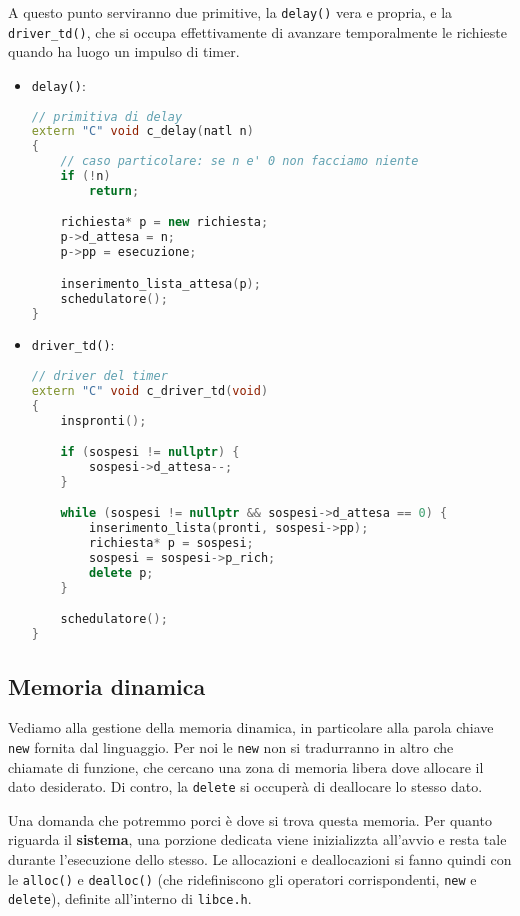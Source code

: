 \documentclass[a4paper,11pt]{article}
\begin{document}
A questo punto serviranno due primitive, la \lstinline|delay()| vera e propria, e la \lstinline|driver_td()|, che si occupa effettivamente di avanzare temporalmente le richieste quando ha luogo un impulso di timer.
\begin{itemize}
	\item \lstinline|delay()|:
\begin{lstlisting}[language=C++, style=codestyle]	
// primitiva di delay
extern "C" void c_delay(natl n)
{
	// caso particolare: se n e' 0 non facciamo niente
	if (!n)
		return;

	richiesta* p = new richiesta;
	p->d_attesa = n;
	p->pp = esecuzione;

	inserimento_lista_attesa(p);
	schedulatore();
}
\end{lstlisting}
	\item \lstinline|driver_td()|:
\begin{lstlisting}[language=C++, style=codestyle]	
// driver del timer
extern "C" void c_driver_td(void)
{
	inspronti();

	if (sospesi != nullptr) {
		sospesi->d_attesa--;
	}

	while (sospesi != nullptr && sospesi->d_attesa == 0) {
		inserimento_lista(pronti, sospesi->pp);
		richiesta* p = sospesi;
		sospesi = sospesi->p_rich;
		delete p;
	}

	schedulatore();
}
\end{lstlisting}
\end{itemize}

\subsection{Memoria dinamica}
\lstset{language=C++}
Vediamo alla gestione della memoria dinamica, in particolare alla parola chiave \lstinline|new| fornita dal linguaggio.
Per noi le \lstinline|new| non si tradurranno in altro che chiamate di funzione, che cercano una zona di memoria libera dove allocare il dato desiderato.
Di contro, la \lstinline|delete| si occuperà di deallocare lo stesso dato.

Una domanda che potremmo porci è dove si trova questa memoria.
Per quanto riguarda il \textbf{sistema}, una porzione dedicata viene inizializzta all'avvio e resta tale durante l'esecuzione dello stesso.
Le allocazioni e deallocazioni si fanno quindi con le \lstinline|alloc()| e \lstinline|dealloc()| (che ridefiniscono gli operatori corrispondenti, \lstinline|new| e \lstinline|delete|), definite all'interno di \lstinline|libce.h|.
\end{document}
